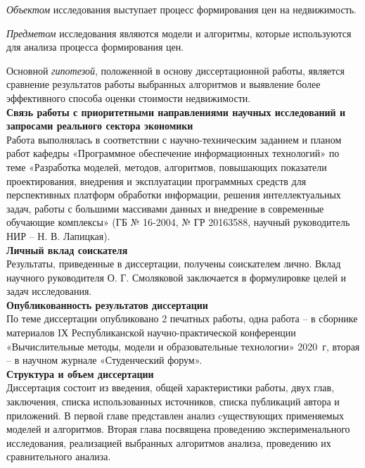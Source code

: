 \textit{Объектом} исследования выступает процесс формирования цен \linebreak на недвижимость.

\textit{Предметом} исследования являются модели и алгоритмы, которые используются для анализа процесса формирования цен.

Основной \textit{гипотезой}, положенной в основу диссертационной работы, является сравнение результатов работы выбранных алгоритмов
и выявление более эффективного способа оценки стоимости недвижимости.
~\\

\textbf{Связь работы с приоритетными направлениями научных исследований и запросами реального сектора экономики}\\

Работа выполнялась в соответствии с научно-техническим заданием и планом работ кафедры «Программное обеспечение
информационных технологий» по теме «Разработка моделей, методов, алгоритмов, повышающих показатели проектирования,
внедрения и эксплуатации программных средств для перспективных платформ обработки информации, решения интеллектуальных
задач, работы с большими массивами данных и внедрение в современные обучающие комплексы» (ГБ  № 16-2004, № ГР 20163588,
научный руководитель НИР -- Н. В. Лапицкая).
~\\

\textbf{Личный вклад соискателя}\\

Результаты, приведенные в диссертации, получены соискателем лично. Вклад научного руководителя О. Г. Смоляковой
заключается в формулировке целей и задач исследования.
~\\

\textbf{Опубликованность результатов диссертации}\\

По теме диссертации опубликовано 2 печатных работы, одна работа -- в сборнике материалов IХ Республиканской
научно-практической конференции «Вычислительные методы, модели и образовательные технологии» 2020~г, вторая -- в
научном журнале «Студенческий форум».
~\\

\textbf{Структура и объем диссертации}\\

Диссертация состоит из введения, общей характеристики работы, двух глав, заключения, списка использованных источников,
списка публикаций автора и приложений. В первой главе представлен анализ cуществующих применяемых моделей и алгоритмов.
Вторая глава посвящена проведению эксперименального исследования, реализацией выбранных алгоритмов анализа, проведению
их сравнительного анализа.

